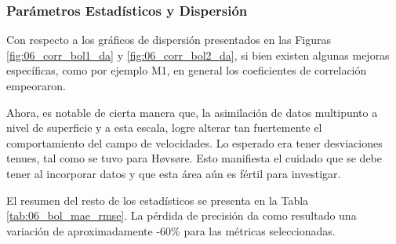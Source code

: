 \subsubsection{Parámetros Estadísticos y Dispersión}
Con respecto a los gráficos de dispersión presentados en las Figuras \ref{fig:06_corr_bol1_da} y \ref{fig:06_corr_bol2_da}, si bien existen algunas mejoras específicas, como por ejemplo M1, en general los coeficientes de correlación empeoraron.  

Ahora, es notable de cierta manera que, la asimilación de datos multipunto a nivel de superficie y a esta escala, logre alterar tan fuertemente el comportamiento del campo de velocidades. Lo esperado era tener desviaciones tenues, tal como se tuvo para Høvsøre. Esto manifiesta el cuidado que se debe tener al incorporar datos y que esta área aún es fértil para investigar.

El resumen del resto de los estadísticos se presenta en la Tabla \ref{tab:06_bol_mae_rmse}. La pérdida de precisión da como resultado una variación de aproximadamente -60\% para las métricas seleccionadas.

